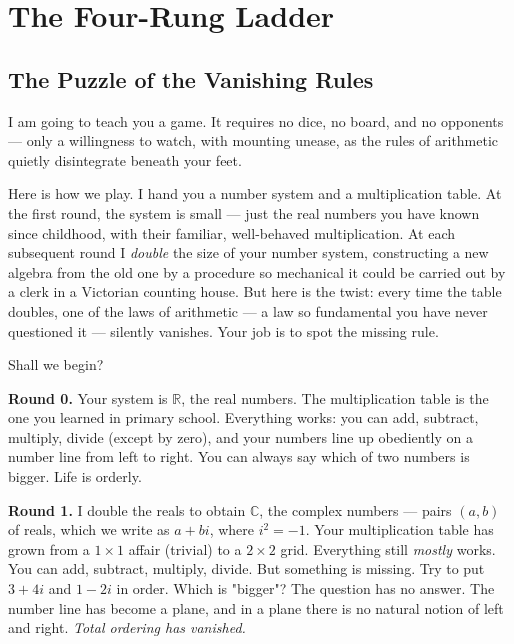 \chapter{The Four-Rung Ladder}



\ornbreak



\section{The Puzzle of the Vanishing Rules}


I am going to teach you a game. It requires no dice, no board, and no opponents --- only a willingness to watch, with mounting unease, as the rules of arithmetic quietly disintegrate beneath your feet.

Here is how we play. I hand you a number system and a multiplication table. At the first round, the system is small --- just the real numbers you have known since childhood, with their familiar, well-behaved multiplication. At each subsequent round I \textit{double} the size of your number system, constructing a new algebra from the old one by a procedure so mechanical it could be carried out by a clerk in a Victorian counting house. But here is the twist: every time the table doubles, one of the laws of arithmetic --- a law so fundamental you have never questioned it --- silently vanishes. Your job is to spot the missing rule.

Shall we begin?

\textbf{Round 0.} Your system is $\mathbb{R}$, the real numbers. The multiplication table is the one you learned in primary school. Everything works: you can add, subtract, multiply, divide (except by zero), and your numbers line up obediently on a number line from left to right. You can always say which of two numbers is bigger. Life is orderly.

\textbf{Round 1.} I double the reals to obtain $\mathbb{C}$, the complex numbers --- pairs $(a, b)$ of reals, which we write as $a + bi$, where $i^2 = -1$. Your multiplication table has grown from a $1 \times 1$ affair (trivial) to a $2 \times 2$ grid. Everything still \textit{mostly} works. You can add, subtract, multiply, divide. But something is missing. Try to put $3 + 4i$ and $1 - 2i$ in order. Which is "bigger"? The question has no answer. The number line has become a plane, and in a plane there is no natural notion of left and right. \textit{Total ordering has vanished.}

